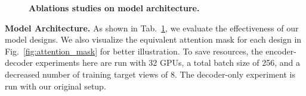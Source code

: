 \begin{figure}[t]
\begin{minipage}[t]{0.37\textwidth}
        \captionsetup{type=table}
        \setlength\tabcolsep{5pt}
        \centering
        \caption{\small{
        \textbf{Ablations studies on model architecture.}
        }}
        \vspace{-0.15in}
        \label{table: ablation_model_arch}
    \end{minipage}
    \vspace{-0.5in}
\end{figure}

\textbf{Model Architecture.} As shown in Tab.~\ref{table: ablation_model_arch}, we evaluate the effectiveness of our model designs. We also visualize the equivalent attention mask for each design in Fig.~\ref{fig:attention_mask} for better illustration. To save resources, the encoder-decoder experiments here are run with 32 GPUs, a total batch size of 256, and a decreased number of training target views of 8. The decoder-only experiment is run with our original setup.



